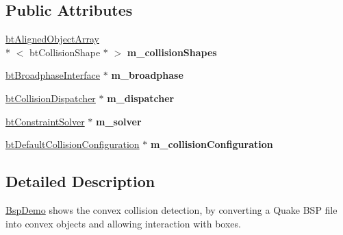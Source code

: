 \subsection*{Public Attributes}
\begin{DoxyCompactItemize}
\item 
\hypertarget{class_bsp_demo_a4c388cd5adc26684b0eaa79630c6b1ad}{\hyperlink{classbt_aligned_object_array}{bt\+Aligned\+Object\+Array}\\*
$<$ bt\+Collision\+Shape $\ast$ $>$ {\bfseries m\+\_\+collision\+Shapes}}\label{class_bsp_demo_a4c388cd5adc26684b0eaa79630c6b1ad}

\item 
\hypertarget{class_bsp_demo_a4fef3317f36b6a12faf253770138f469}{\hyperlink{classbt_broadphase_interface}{bt\+Broadphase\+Interface} $\ast$ {\bfseries m\+\_\+broadphase}}\label{class_bsp_demo_a4fef3317f36b6a12faf253770138f469}

\item 
\hypertarget{class_bsp_demo_aac50c5d5e582dad71009362455ceeac5}{\hyperlink{classbt_collision_dispatcher}{bt\+Collision\+Dispatcher} $\ast$ {\bfseries m\+\_\+dispatcher}}\label{class_bsp_demo_aac50c5d5e582dad71009362455ceeac5}

\item 
\hypertarget{class_bsp_demo_a788eb9557fde38bf9a1a90219fdc82b1}{\hyperlink{classbt_constraint_solver}{bt\+Constraint\+Solver} $\ast$ {\bfseries m\+\_\+solver}}\label{class_bsp_demo_a788eb9557fde38bf9a1a90219fdc82b1}

\item 
\hypertarget{class_bsp_demo_a27136d04ecfb880d6908915b3adaf1f9}{\hyperlink{classbt_default_collision_configuration}{bt\+Default\+Collision\+Configuration} $\ast$ {\bfseries m\+\_\+collision\+Configuration}}\label{class_bsp_demo_a27136d04ecfb880d6908915b3adaf1f9}

\end{DoxyCompactItemize}


\subsection{Detailed Description}
\hyperlink{class_bsp_demo}{Bsp\+Demo} shows the convex collision detection, by converting a Quake B\+S\+P file into convex objects and allowing interaction with boxes. 

